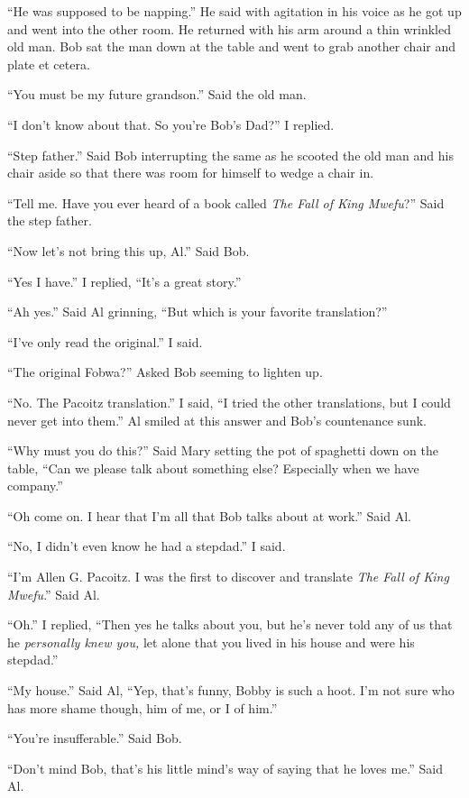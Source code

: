 ``He was supposed to be napping.'' He said with agitation in his voice as he got up and went into the other room. He returned with his arm around a thin wrinkled old man. Bob sat the man down at the table and went to grab another chair and plate et cetera.

``You must be my future grandson.'' Said the old man.

``I don't know about that. So you're Bob's Dad?'' I replied.

``Step father.'' Said Bob interrupting the same as he scooted the old man and his chair aside so that there was room for himself to wedge a chair in.

``Tell me. Have you ever heard of a book called \emph{The Fall of King Mwe\-fu}?'' Said the step father.

``Now let's not bring this up, Al.'' Said Bob.

``Yes I have.'' I replied, ``It's a great story.''

``Ah yes.'' Said Al grinning, ``But which is your favorite translation?''

``I've only read the original.'' I said.

``The original Fobwa?'' Asked Bob seeming to lighten up.

``No. The Pa\-co\-itz translation.'' I said, ``I tried the other translations, but I could never get into them.'' Al smiled at this answer and Bob's countenance sunk.

``Why must you do this?'' Said Mary setting the pot of spaghetti down on the table, ``Can we please talk about something else? Especially when we have company.''

``Oh come on. I hear that I'm all that Bob talks about at work.'' Said Al.

``No, I didn't even know he had a stepdad.'' I said.

``I'm Allen G. Pa\-co\-itz. I was the first to discover and translate \emph{The Fall of King Mwe\-fu}.'' Said Al.

``Oh.'' I replied, ``Then yes he talks about you, but he's never told any of us that he \emph{personally knew you,} let alone that you lived in his house and were his stepdad.''

``My house.'' Said Al, ``Yep, that's funny, Bobby is such a hoot. I'm not sure who has more shame though, him of me, or I of him.''

``You're insufferable.'' Said Bob.

``Don't mind Bob, that's his little mind's way of saying that he loves me.'' Said Al.

